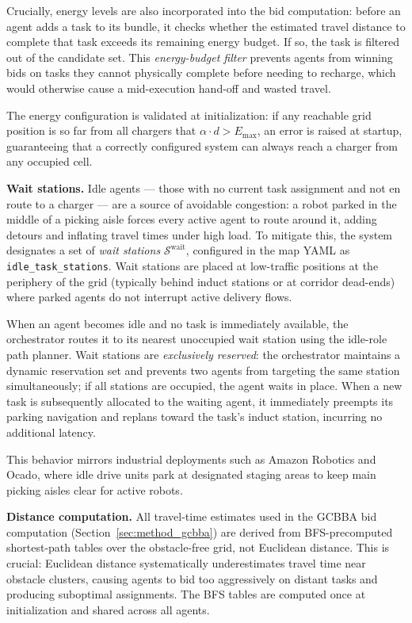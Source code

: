 Crucially, energy levels are also incorporated into the bid computation:
before an agent adds a task to its bundle, it checks whether the estimated
travel distance to complete that task exceeds its remaining energy budget.
If so, the task is filtered out of the candidate set.
This \emph{energy-budget filter} prevents agents from winning bids on tasks
they cannot physically complete before needing to recharge, which would
otherwise cause a mid-execution hand-off and wasted travel.

The energy configuration is validated at initialization: if any reachable
grid position is so far from all chargers that $\alpha \cdot d > E_{\max}$,
an error is raised at startup, guaranteeing that a correctly configured
system can always reach a charger from any occupied cell.

\textbf{Wait stations.}
Idle agents --- those with no current task assignment and not en route to a
charger --- are a source of avoidable congestion: a robot parked in the
middle of a picking aisle forces every active agent to route around it,
adding detours and inflating travel times under high load.
To mitigate this, the system designates a set of \emph{wait stations}
$\mathcal{S}^{\text{wait}}$, configured in the map YAML as
\texttt{idle\_task\_stations}.
Wait stations are placed at low-traffic positions at the periphery of the
grid (typically behind induct stations or at corridor dead-ends) where
parked agents do not interrupt active delivery flows.

When an agent becomes idle and no task is immediately available, the
orchestrator routes it to its nearest unoccupied wait station using the
idle-role path planner.
Wait stations are \emph{exclusively reserved}: the orchestrator maintains a
dynamic reservation set and prevents two agents from targeting the same
station simultaneously; if all stations are occupied, the agent waits in
place.
When a new task is subsequently allocated to the waiting agent, it
immediately preempts its parking navigation and replans toward the task's
induct station, incurring no additional latency.

This behavior mirrors industrial deployments such as Amazon Robotics and
Ocado, where idle drive units park at designated staging areas to keep main
picking aisles clear for active robots.

\textbf{Distance computation.}
All travel-time estimates used in the GCBBA bid computation
(Section~\ref{sec:method_gcbba}) are derived from BFS-precomputed shortest-path
tables over the obstacle-free grid, not Euclidean distance.
This is crucial: Euclidean distance systematically underestimates travel time
near obstacle clusters, causing agents to bid too aggressively on distant tasks
and producing suboptimal assignments.
The BFS tables are computed once at initialization and shared across all agents.


